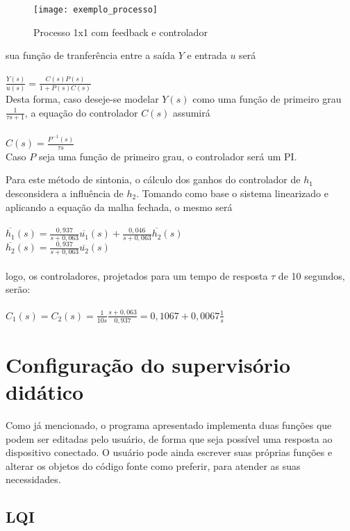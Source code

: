 \begin{figure}[H]
	\centering
	\texttt{[image: exemplo\_processo]}
	\caption{Processo 1x1 com feedback e controlador}
	\label{img_exemplo_processo}
\end{figure}

sua função de tranferência entre a saída $Y$ e entrada $u$ será
\\\\
$
\frac{Y(s)}{u(s)} = \frac{C(s)P(s)}{1+P(s)C(s)}
$
\\

Desta forma, caso deseje-se modelar $Y(s)$ como uma função de primeiro grau $\frac{1}{\tau s + 1}$, a equação do controlador $C(s)$ assumirá
\\\\
$
C(s) = \frac{P^{-1}(s)}{\tau s}
$
\\

Caso $P$ seja uma função de primeiro grau, o controlador será um PI.

Para este método de sintonia, o cálculo dos ganhos do controlador de $h_1$ desconsidera a influência de $h_2$. Tomando como base o sistema linearizado e aplicando a equação da malha fechada, o mesmo será
\\\\
$
\overline{h_1}(s) = \frac{0,937}{s + 0,063} \overline{u_1}(s) + \frac{0,046}{s + 0,063} \overline{h_2}(s) 
$
\\
$
\overline{h_2}(s) = \frac{0,937}{s + 0,063} \overline{u_2}(s)
$
\\\\
logo, os controladores, projetados para um tempo de resposta $\tau$ de 10 segundos, serão:
\\\\
$
C_1(s) = C_2(s) = \frac{1}{10s} \frac{s + 0,063}{0,937} = 0,1067 + 0,0067 \frac{1}{s}
$

\section{Configuração do supervisório didático}

Como já mencionado, o programa apresentado implementa duas funções que podem ser editadas pelo usuário, de forma que seja possível uma resposta ao dispositivo conectado. O usuário pode ainda escrever suas próprias funções e alterar os objetos do código fonte como preferir, para atender as suas necessidades. 

\subsection{LQI}

